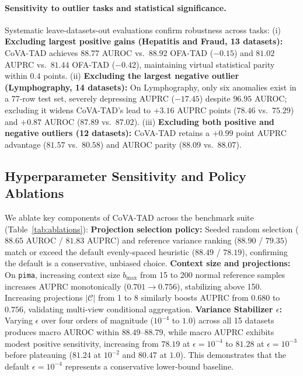 \documentclass{article}
\begin{document}
\paragraph{Sensitivity to outlier tasks and statistical significance.}
Systematic leave-datasets-out evaluations confirm robustness across tasks:
(i) \textbf{Excluding largest positive gains (Hepatitis and Fraud, 13 datasets):} CoVA-TAD achieves $88.77$ AUROC vs.\ $88.92$ OFA-TAD ($-0.15$) and $81.02$ AUPRC vs.\ $81.44$ OFA-TAD ($-0.42$), maintaining virtual statistical parity within $0.4$ points.
(ii) \textbf{Excluding the largest negative outlier (Lymphography, 14 datasets):} On Lymphography, only six anomalies exist in a 77-row test set, severely depressing AUPRC ($-17.45$) despite $96.95$ AUROC; excluding it widens CoVA-TAD's lead to $+3.16$ AUPRC points ($78.46$ vs.\ $75.29$) and $+0.87$ AUROC ($87.89$ vs.\ $87.02$).
(iii) \textbf{Excluding both positive and negative outliers (12 datasets):} CoVA-TAD retains a $+0.99$ point AUPRC advantage ($81.57$ vs.\ $80.58$) and AUROC parity ($88.09$ vs.\ $88.07$).

\subsection{Hyperparameter Sensitivity and Policy Ablations}
\label{subsec:ablations}

We ablate key components of CoVA-TAD across the benchmark suite (Table~\ref{tab:ablations}):
\textbf{Projection selection policy:} Seeded random selection ($88.65$ AUROC / $81.83$ AUPRC) and reference variance ranking ($88.90$ / $79.35$) match or exceed the default evenly-spaced heuristic ($88.49$ / $78.19$), confirming the default is a conservative, unbiased choice.
\textbf{Context size and projections:} On \texttt{pima}, increasing context size $b_{\max}$ from 15 to 200 normal reference samples increases AUPRC monotonically ($0.701 \to 0.756$), stabilizing above 150. Increasing projections $|\mathcal{C}|$ from 1 to 8 similarly boosts AUPRC from $0.680$ to $0.756$, validating multi-view conditional aggregation.
\textbf{Variance Stabilizer $\epsilon$:} Varying $\epsilon$ over four orders of magnitude ($10^{-4}$ to $1.0$) across all 15 datasets produces macro AUROC within $88.49$--$88.79$, while macro AUPRC exhibits modest positive sensitivity, increasing from $78.19$ at $\epsilon=10^{-4}$ to $81.28$ at $\epsilon=10^{-3}$ before plateauing ($81.24$ at $10^{-2}$ and $80.47$ at $1.0$). This demonstrates that the default $\epsilon=10^{-4}$ represents a conservative lower-bound baseline.
\end{document}
